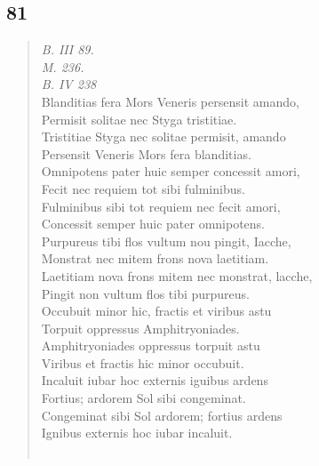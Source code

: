 \documentclass[11pt, a4paper]{report}
\begin{document}
            \subsection*{81}
      \begin{verse}
      \textit{B. III 89.} \\ \textit{M. 236.} \\ \textit{B. IV 238} \\ Blanditias fera Mors Veneris persensit amando, \\ Permisit solitae nec Styga tristitiae. \\ Tristitiae Styga nec solitae permisit, amando \\ Persensit Veneris Mors fera blanditias. \\ Omnipotens pater huic semper concessit amori, \\ Fecit nec requiem tot sibi fulminibus. \\ Fulminibus sibi tot requiem nec fecit amori, \\ Concessit semper huic pater omnipotens. \\ Purpureus tibi flos vultum nou pingit, Iacche, \\ Monstrat nec mitem frons nova laetitiam. \\ Laetitiam nova frons mitem nec monstrat, lacche, \\ Pingit non vultum flos tibi purpureus. \\ Occubuit minor hic, fractis et viribus astu \\ Torpuit oppressus Amphitryoniades. \\ Amphitryoniades oppressus torpuit astu \\ Viribus et fractis hic minor occubuit. \\ Incaluit iubar hoc externis iguibus ardens \\ Fortius; ardorem Sol sibi congeminat. \\ Congeminat sibi Sol ardorem; fortius ardens \\ Ignibus externis hoc iubar incaluit. \\ 
        ﻿\pagebreak 

\end{verse}
\end{document}
